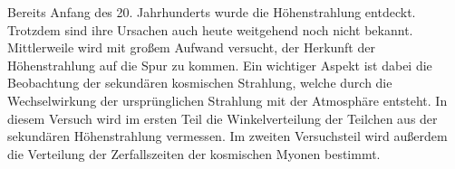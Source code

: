 Bereits Anfang des 20. Jahrhunderts wurde die Höhenstrahlung entdeckt. Trotzdem sind ihre Ursachen auch heute weitgehend noch nicht bekannt. Mittlerweile wird mit großem Aufwand versucht, der Herkunft der Höhenstrahlung auf die Spur zu kommen. Ein wichtiger Aspekt ist dabei die Beobachtung der sekundären kosmischen Strahlung, welche durch die Wechselwirkung der ursprünglichen Strahlung mit der Atmosphäre entsteht. In diesem Versuch wird im ersten Teil die Winkelverteilung der Teilchen aus der sekundären Höhenstrahlung vermessen. Im zweiten Versuchsteil wird außerdem die Verteilung der Zerfallszeiten der kosmischen Myonen bestimmt.   
